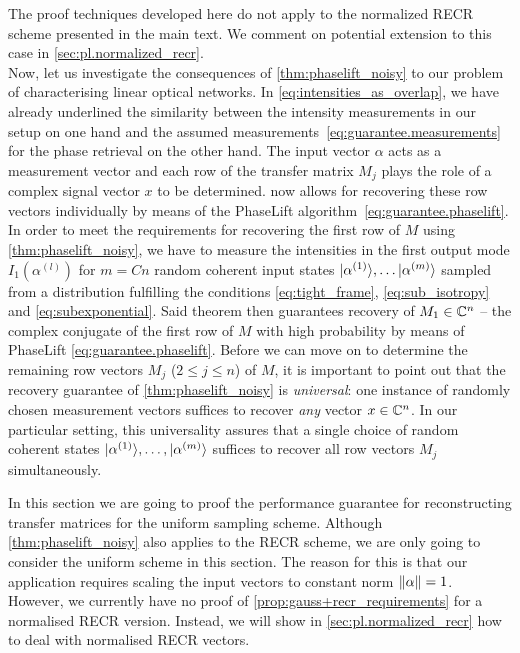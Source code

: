 The proof techniques developed here do not apply to the normalized RECR scheme presented in the main text.
We comment on potential extension to this case in \cref{sec:pl.normalized_recr}.\\


Now, let us investigate the consequences of \cref{thm:phaselift_noisy} to our problem of characterising linear optical networks.
In \cref{eq:intensities_as_overlap}, we have already underlined the similarity between the intensity measurements in our setup on one hand and the assumed measurements~\eqref{eq:guarantee.measurements} for the phase retrieval on the other hand.
The input vector ${\alpha}$ acts as a measurement vector and each row of the transfer matrix ${M}_j$ plays the role of a complex signal vector $ x$ to be determined.
 now allows for recovering these row vectors individually by means of the PhaseLift algorithm~\eqref{eq:guarantee.phaselift}.
In order to meet the requirements for recovering the first row of ${M}$ using \cref{thm:phaselift_noisy}, we have to measure the intensities in the first output mode $I_1(\alpha^{(l)})$ for $m = Cn$ random coherent input states $\ket{{\alpha}^{(1)}}, \ldots \ket{{\alpha}^{(m)}}$ sampled from a distribution fulfilling the conditions \eqref{eq:tight_frame}, \eqref{eq:sub_isotropy} and \eqref{eq:subexponential}.
Said theorem then guarantees recovery of ${M}_1 \in {\mathbb{C}}^n$ -- the complex conjugate of the first row of $ M$ with high probability by means of PhaseLift \eqref{eq:guarantee.phaselift}.
Before we can move on to determine the remaining row vectors ${M}_{j}$ ($2 \leq j \leq n$) of ${M}$, it is important to point out that the recovery guarantee of \cref{thm:phaselift_noisy} is \emph{universal}: one instance of randomly chosen measurement vectors suffices to recover \emph{any} vector ${x} \in {\mathbb{C}}^n$.
In our particular setting, this universality assures that a single choice of random coherent states $\ket{{\alpha}^{(1)}},\ldots,\ket{{\alpha}^{(m)}}$ suffices to recover all row vectors ${M}_j$ simultaneously.

In this section we are going to proof the performance guarantee for reconstructing transfer matrices for the uniform sampling scheme.
Although \cref{thm:phaselift_noisy} also applies to the RECR scheme, we are only going to consider the uniform scheme in this section.
The reason for this is that our application requires scaling the input vectors to constant norm ${\Vert\alpha\Vert} = 1$.
However, we currently have no proof of \cref{prop:gauss+recr_requirements} for a normalised RECR version.
Instead, we will show in \cref{sec:pl.normalized_recr} how to deal with normalised RECR vectors.

